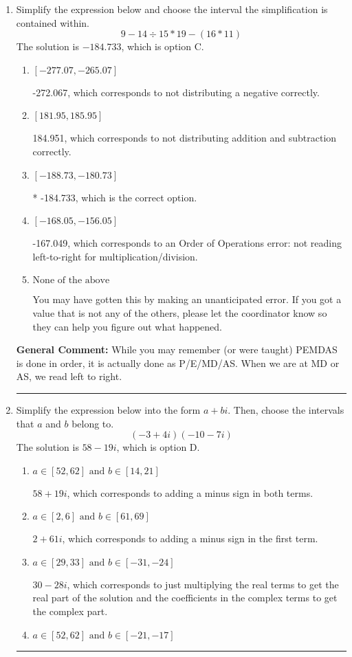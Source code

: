 \documentclass{extbook}[14pt]
\newcommand{\litem}[1]{\item #1

\rule{\textwidth}{0.4pt}}
\begin{document}
\begin{enumerate}\litem{
Simplify the expression below and choose the interval the simplification is contained within.
\[ 9 - 14 \div 15 * 19 - (16 * 11) \]
The solution is \( -184.733 \), which is option C.\begin{enumerate}[label=\Alph*.]
\item \( [-277.07, -265.07] \)

 -272.067, which corresponds to not distributing a negative correctly.
\item \( [181.95, 185.95] \)

 184.951, which corresponds to not distributing addition and subtraction correctly.
\item \( [-188.73, -180.73] \)

* -184.733, which is the correct option.
\item \( [-168.05, -156.05] \)

 -167.049, which corresponds to an Order of Operations error: not reading left-to-right for multiplication/division.
\item \( \text{None of the above} \)

 You may have gotten this by making an unanticipated error. If you got a value that is not any of the others, please let the coordinator know so they can help you figure out what happened.
\end{enumerate}

\textbf{General Comment:} While you may remember (or were taught) PEMDAS is done in order, it is actually done as P/E/MD/AS. When we are at MD or AS, we read left to right.
}
\litem{
Simplify the expression below into the form $a+bi$. Then, choose the intervals that $a$ and $b$ belong to.
\[ (-3 + 4 i)(-10 - 7 i) \]
The solution is \( 58 - 19 i \), which is option D.\begin{enumerate}[label=\Alph*.]
\item \( a \in [52, 62] \text{ and } b \in [14, 21] \)

 $58 + 19 i$, which corresponds to adding a minus sign in both terms.
\item \( a \in [2, 6] \text{ and } b \in [61, 69] \)

 $2 + 61 i$, which corresponds to adding a minus sign in the first term.
\item \( a \in [29, 33] \text{ and } b \in [-31, -24] \)

 $30 - 28 i$, which corresponds to just multiplying the real terms to get the real part of the solution and the coefficients in the complex terms to get the complex part.
\item \( a \in [52, 62] \text{ and } b \in [-21, -17] \)


\end{enumerate}}
\end{enumerate}
\end{document}
